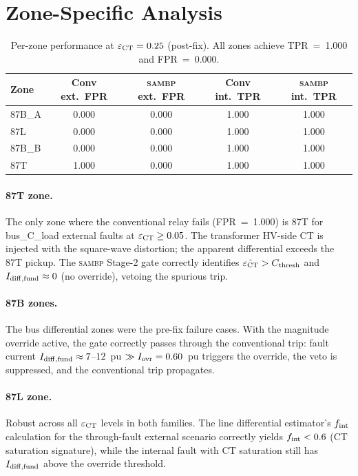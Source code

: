 \documentclass[12pt,a4paper]{article}
\newcommand{\SAMBP}{\textsc{sambp}}
\newcommand{\fint}{f_{\rm int}}
\newcommand{\epsct}{\varepsilon_{\rm CT}}
\begin{document}
\section{Zone-Specific Analysis}

\begin{table}[ht]
\centering
\caption{Per-zone performance at $\epsct = 0.25$ (post-fix).
  All zones achieve TPR~=~1.000 and FPR~=~0.000.}
\label{tab:perzone}
\begin{tabular}{lcccc}
\toprule
Zone & Conv ext.\ FPR & \SAMBP{} ext.\ FPR &
       Conv int.\ TPR & \SAMBP{} int.\ TPR \\
\midrule
87B\_A & 0.000 & 0.000 & 1.000 & 1.000 \\
87L    & 0.000 & 0.000 & 1.000 & 1.000 \\
87B\_B & 0.000 & 0.000 & 1.000 & 1.000 \\
87T    & 1.000 & 0.000 & 1.000 & 1.000 \\
\bottomrule
\end{tabular}
\end{table}

\paragraph{87T zone.}
The only zone where the conventional relay fails (FPR~=~1.000) is 87T for
bus\_C\_load external faults at $\epsct \geq 0.05$.  The transformer
HV-side CT is injected with the square-wave distortion; the apparent
differential exceeds the 87T pickup.  The \SAMBP{} Stage-2 gate correctly
identifies $\hat{\epsct} > C_{\rm thresh}$ and $I_{\rm diff,fund}
\approx 0$ (no override), vetoing the spurious trip.

\paragraph{87B zones.}
The bus differential zones were the pre-fix failure cases.  With the
magnitude override active, the gate correctly passes through the conventional
trip: fault current $I_{\rm diff,fund} \approx 7$--$12$~pu $\gg I_{\rm ovr}
= 0.60$~pu triggers the override, the veto is suppressed, and the
conventional trip propagates.

\paragraph{87L zone.}
Robust across all $\epsct$ levels in both families.  The line differential
estimator's $\fint$ calculation for the through-fault external scenario
correctly yields $\fint < 0.6$ (CT saturation signature), while the
internal fault with CT saturation still has $I_{\rm diff,fund}$ above
the override threshold.
\end{document}
